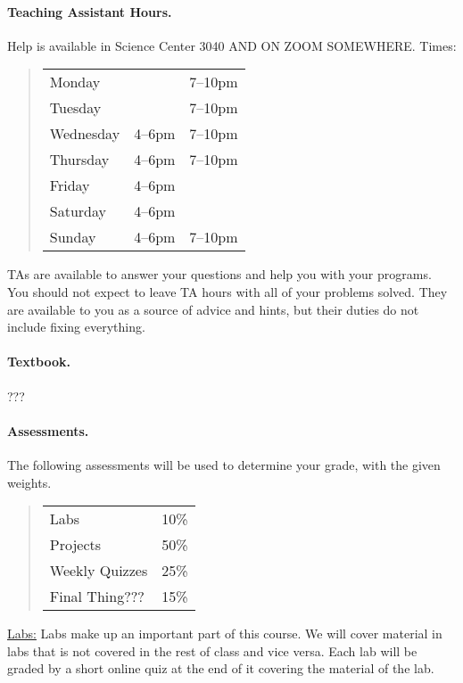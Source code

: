 \documentclass[12pt]{article}
\begin{document}
\paragraph*{Teaching Assistant Hours.} Help is available in Science Center 3040 AND ON ZOOM SOMEWHERE. Times:

\begin{quote}
\begin{tabular}{p{0.9in}p{0.6in}l}
Monday & & 7--10pm \\
Tuesday & & 7--10pm \\
Wednesday & 4--6pm & 7--10pm \\
Thursday & 4--6pm & 7--10pm \\
Friday & 4--6pm & \\
Saturday & 4--6pm & \\
Sunday & 4--6pm & 7--10pm \\
\end{tabular}
\end{quote}

TAs are available to answer your questions and help you with your programs. You should not expect to leave TA hours with all of your problems solved. They are available to you as a source of advice and hints, but their duties do not include fixing everything.

\paragraph*{Textbook.} ???

\paragraph{Assessments.} The following assessments will be used to determine your grade, with the given weights.

\begin{quote}
\begin{tabular}{p{1.75in}p{.5in}}
Labs & 10\% \\
Projects & 50\% \\
Weekly Quizzes & 25\% \\
Final Thing??? & 15\% \\
\end{tabular}
\end{quote}

\noindent
\underline{Labs:} Labs make up an important part of this course. We will cover material in labs that is not covered in the rest of class and vice versa. Each lab will be graded by a short online quiz at the end of it covering the material of the lab.
\end{document}
